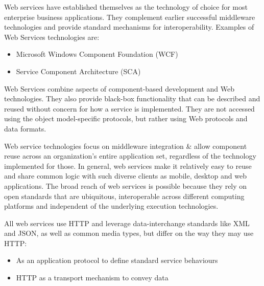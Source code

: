     Web services have established themselves as the technology of choice for most enterprise business
    applications. They complement earlier successful middleware technologies and provide standard mechanisms
    for interoperability. Examples of Web Services technologies are:
    \begin{itemize}
        \item Microsoft Windows Component Foundation (WCF)
        \item Service Component Architecture (SCA)
    \end{itemize}

    Web Services combine aspects of component-based development and Web technologies. They also provide black-box
    functionality that can be described and reused without concern for how a service is implemented. They are not
    accessed using the object model-specific protocols, but rather using Web protocols and data formats.

    Web service technologies focus on middleware integration \& allow component reuse across an organization's
    entire application set, regardless of the technology implemented for those. In general, web services make it
    relatively easy to reuse and share common logic with such diverse clients as mobile, desktop and web
    applications. The broad reach of web services is possible because they rely on open standards that are
    ubiquitous, interoperable across different computing platforms and independent of the underlying execution
    technologies.

    All web services use HTTP and leverage data-interchange standards like XML and JSON, as well as common media
    types, but differ on the way they may use HTTP:
    \begin{itemize}
        \item As an application protocol to define standard service behaviours
        \item HTTP as a transport mechanism to convey data
    \end{itemize}

